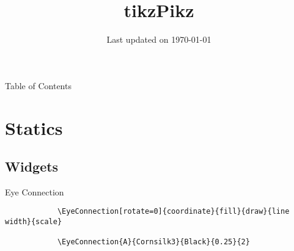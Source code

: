 \documentclass[9pt,xcolor={svgnames, x11names}]{beamer}
\title[\color{black}TikzPikz]{\Huge tikzPikz}
\subtitle{} %
\institute{\small Source code at: \lb{\footnotesize\url{https://github.com/dmorgorg/tikzPikz}}}
\author{} %
\date{\small Last updated on \today}
\begin{document}

    \begin{frame}
        \titlepage 
    \end{frame}
    
    \begin{frame}{Table of Contents}
        \cmini[0.6]{
            \tableofcontents
        }
    \end{frame}   
    
    \centering


    \section{Statics}


    \subsection{Widgets}

    
    \begin{frame}[fragile]{Eye Connection}

        \footnotesize
        \begin{verbatim}
            \EyeConnection[rotate=0]{coordinate}{fill}{draw}{line width}{scale}

            \EyeConnection{A}{Cornsilk3}{Black}{0.25}{2}
        \end{verbatim}
      
        \vspace{1cm}
      
      
    \end{frame}

    
\end{document}
